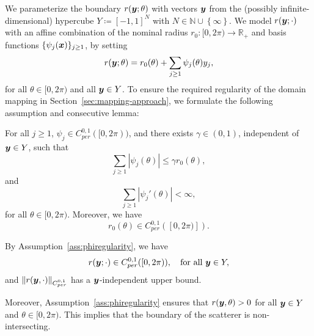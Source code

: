 We parameterize the boundary $r({\bm{y}};\theta)$ with vectors ${\bm{y}}$ from the (possibly infinite-dimensional) hypercube $Y\coloneqq[-1, 1]^N$ with $N\in\mathbb{N}\cup \left\{ \infty \right\}$.
We model $r({\bm{y}};\cdot)$ with an affine combination of the nominal radius $r_0:[0,2\pi)\to\mathbb{R}_+$ and basis functions $\{\psi_j({{\bm{x}}})\}_{j \geq 1}$, by setting
\begin{align}
    r({\bm{y}};\theta) = r_0(\theta) + \sum_{j \geq 1}\psi_j(\theta)y_j,\label{eq:rdef}
\end{align}
for all $\theta\in[0, 2\pi)$ and all ${\bm{y}}\in Y$.
To ensure the required regularity of the domain mapping in Section~\ref{sec:mapping-approach}, we formulate the following assumption and consecutive lemma:
\begin{assumption} \label{ass:phiregularity}
For all $j \geq 1$, $\psi_j \in C^{0, 1}_{per}([0,2\pi))$, and there exists $\gamma \in (0,1)$, independent of ${\bm{y}}\in Y$, such that
\begin{equation*}
    \sum_{j \geq 1}|\psi_j(\theta)| \leq \gamma r_0(\theta),
\end{equation*}
and
\begin{equation*}
    \sum_{j \geq 1}|\psi_j'(\theta)|  < \infty,
\end{equation*}
for all $\theta\in[0, 2\pi)$.
Moreover, we have
\begin{equation*}
    r_0(\theta) \in C^{0,1}_{per}([0,2\pi )]).
\end{equation*}
\end{assumption}
\begin{lemma}
    By Assumption~\ref{ass:phiregularity}, we have
    \begin{equation*}
        r({\bm{y}}; \cdot) \in C^{0, 1}_{per}([0,2\pi)),\quad \text{for all } {\bm{y}} \in Y,
    \end{equation*}
    and $\|r({\bm{y}}, \cdot)\|_{C^{0,1}_{per}}$ has a ${\bm{y}}$-independent upper bound.
\end{lemma}
Moreover, Assumption~\ref{ass:phiregularity} ensures that $r({\bm{y}}, \theta) > 0$ for all ${\bm{y}}\in Y$ and $\theta\in[0,2\pi)$.
This implies that the boundary of the scatterer is non-intersecting.


